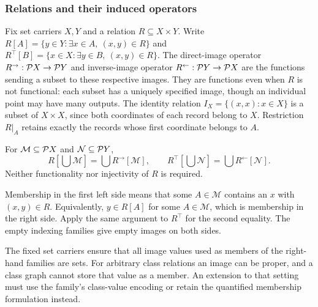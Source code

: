 \subsubsection{Relations and their induced operators}
Fix set carriers $X,Y$ and a relation $R\subseteq X\times Y$.
Write $R[A]=\{y\in Y:\exists x\in A,\ (x,y)\in R\}$ and
$R^\top[B]=\{x\in X:\exists y\in B,\ (x,y)\in R\}$.
The direct-image operator $R^{\rightarrow}:\mathcal{P} X\to\mathcal{P} Y$
and inverse-image operator $R^{\leftarrow}:\mathcal{P} Y\to\mathcal{P} X$
are the functions sending a subset to these respective images.
They are functions even when $R$ is not functional: each subset has a
uniquely specified image, though an individual point may have many outputs.
The identity relation $I_X=\{(x,x):x\in X\}$ is a subset of
$X\times X$, since both coordinates of each record belong to $X$.
Restriction $R|_A$ retains exactly the records whose first coordinate
belongs to $A$.

\begin{theorem}
For $\mathcal M\subseteq\mathcal{P} X$ and
$\mathcal N\subseteq\mathcal{P} Y$,
\[
R[\bigcup\mathcal M]=\bigcup R^{\rightarrow}[\mathcal M],
\qquad
R^\top[\bigcup\mathcal N]=\bigcup R^{\leftarrow}[\mathcal N].
\]
Neither functionality nor injectivity of $R$ is required.
\end{theorem}
\Proof
Membership in the first left side means that some $A\in\mathcal M$
contains an $x$ with $(x,y)\in R$. Equivalently, $y\in R[A]$ for
some $A\in\mathcal M$, which is membership in the right side.
Apply the same argument to $R^\top$ for the second equality.
The empty indexing families give empty images on both sides.
\Done

The fixed set carriers ensure that all image values used as members of
the right-hand families are sets. For arbitrary class relations an image
can be proper, and a class graph cannot store that value as a member.
An extension to that setting must use the family's class-value encoding
or retain the quantified membership formulation instead.

